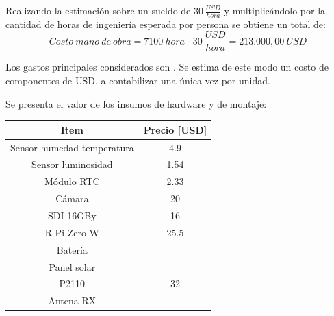 Realizando la estimación sobre un sueldo de $30 \ \frac{USD}{hora}$ y multiplicándolo por la cantidad de horas de ingeniería esperada por persona se obtiene un total de: $$Costo \ mano \ de \ obra = 7100 \ hora \ \cdot 30 \ \frac{USD}{hora} = 213.000,00 \ USD$$



Los gastos principales considerados son \TBD. %
Se estima de este modo un costo de componentes de \TBD USD, a contabilizar una única vez por unidad.

Se presenta el valor de los insumos de hardware y de montaje:
\begin{table}[H]
\centering
\begin{tabular}{|c|c|}
\hline
\textbf{Item}                                                         & \textbf{Precio [USD]}				  \\ \hline
Sensor humedad-temperatura 											  & 4.9                                   \\ \hline
Sensor luminosidad                                                    & 1.54                                  \\ \hline
M\'odulo RTC                                                     & 2.33                                  \\ \hline
Cámara                                                                & 20                                    \\ \hline
SDI 16GBy                                                             & 16                                    \\ \hline
R-Pi Zero W                                                           & 25.5                                  \\ \hline
Batería                                                               & \TBD                   				  \\ \hline
Panel solar                                                           & \TBD                   				  \\ \hline
P2110                                                                 & 32                                    \\ \hline
Antena RX                                                             & \TBD                   				  \\ \hline

\end{tabular}
\end{table}
